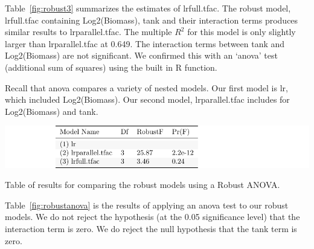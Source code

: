 Table~\ref{fig:robust3} summarizes the estimates of lrfull.tfac. The robust model, lrfull.tfac containing Log2(Biomass), tank and their interaction terms produces similar results to lrparallel.tfac.
 The multiple $R^{2}$ for this model is only slightly larger than lrparallel.tfac at 0.649. The interaction terms between tank and Log2(Biomass) are not significant.  We confirmed this with an `anova' test (additional sum of squares) using the built in R function. 
  
\vspace{12pt}


 Recall that anova compares a variety of nested models. Our first model is lr, which included Log2(Biomass). Our second model, lrparallel.tfac includes for Log2(Biomass) and tank. 
 



\begin{table}[H]
\includegraphics{Chapter3Images/robustanova.pdf}
\caption{\hspace{1mm}Table of results for comparing the robust models using a Robust ANOVA.}
\label{fig:robustanova}
\end{table}

Table~\ref{fig:robustanova} is the results of applying an anova test to our robust models. We do not reject the hypothesis (at the 0.05 significance level) that the interaction term is zero. We do reject the null hypothesis that the tank term is zero.















